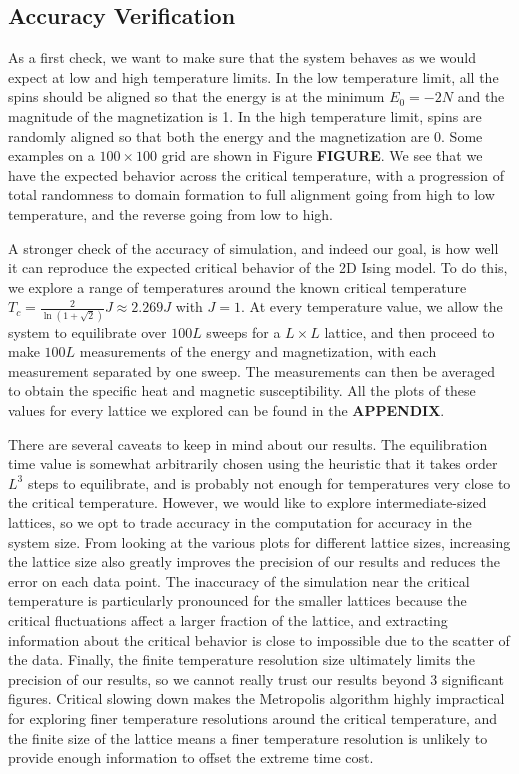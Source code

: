 \documentclass[twocolumn,aps,prl]{revtex4-1} %
\begin{document}
\subsection{Accuracy Verification}
As a first check, we want to make sure that the system behaves as we would expect at low and high temperature limits. In the low temperature limit, all the spins should be aligned so that the energy is at the minimum $E_0 = -2N$ and the magnitude of the magnetization is 1. In the high temperature limit, spins are randomly aligned so that both the energy and the magnetization are 0. Some examples on a $100 \times 100$ grid are shown in Figure \textbf{FIGURE}. We see that we have the expected behavior across the critical temperature, with a progression of total randomness to domain formation to full alignment going from high to low temperature, and the reverse going from low to high.

A stronger check of the accuracy of simulation, and indeed our goal, is how well it can reproduce the expected critical behavior of the 2D Ising model. To do this, we explore a range of temperatures around the known critical temperature $T_c = \frac{2}{\ln(1+\sqrt{2})}J \approx 2.269J$ with $J = 1$. At every temperature value, we allow the system to equilibrate over $100L$ sweeps for a $L \times L$ lattice, and then proceed to make $100L$ measurements of the energy and magnetization, with each measurement separated by one sweep. The measurements can then be averaged to obtain the specific heat and magnetic susceptibility. All the plots of these values for every lattice we explored can be found in the \textbf{APPENDIX}.

There are several caveats to keep in mind about our results. The equilibration time value is somewhat arbitrarily chosen using the heuristic that it takes order $L^3$ steps to equilibrate, and is probably not enough for temperatures very close to the critical temperature. However, we would like to explore intermediate-sized lattices, so we opt to trade accuracy in the computation for accuracy in the system size. From looking at the various plots for different lattice sizes, increasing the lattice size also greatly improves the precision of our results and reduces the error on each data point. The inaccuracy of the simulation near the critical temperature is particularly pronounced for the smaller lattices because the critical fluctuations affect a larger fraction of the lattice, and extracting information about the critical behavior is close to impossible due to the scatter of the data. Finally, the finite temperature resolution size ultimately limits the precision of our results, so we cannot really trust our results beyond 3 significant figures. Critical slowing down makes the Metropolis algorithm highly impractical for exploring finer temperature resolutions around the critical temperature, and the finite size of the lattice means a finer temperature resolution is unlikely to provide enough information to offset the extreme time cost.
\end{document}
